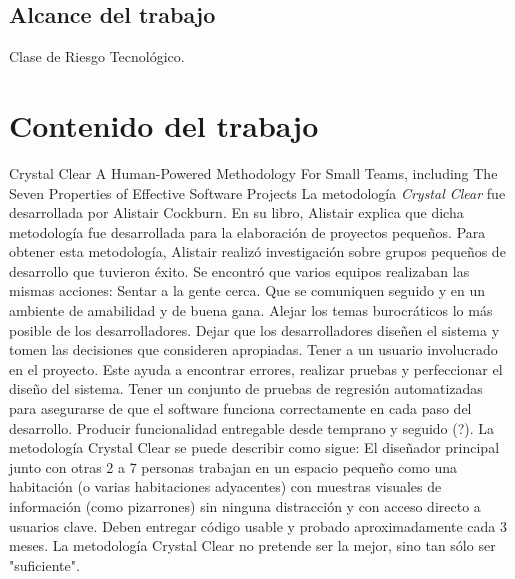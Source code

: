 \documentclass[12pt,a4paper]{article}
\begin{document}
\subsection{Alcance del trabajo}
Clase de Riesgo Tecnol\'ogico.
\pagebreak
\section{Contenido del trabajo}
Crystal Clear
A Human-Powered Methodology For Small Teams,
including
The Seven Properties of Effective Software Projects
\linebreak
La metodolog\'ia \textit{Crystal Clear} fue desarrollada por Alistair Cockburn.
En su libro, Alistair explica que dicha metodolog\'ia fue desarrollada para la elaboraci\'on de proyectos peque\~nos.
Para obtener esta metodolog\'ia, Alistair realiz\'o investigaci\'on sobre grupos peque\~nos de desarrollo que tuvieron \'exito. Se encontr\'o que varios equipos realizaban las mismas acciones:
Sentar a la gente cerca. Que se comuniquen seguido y en un ambiente de amabilidad y de buena gana.
Alejar los temas burocr\'aticos lo m\'as posible de los desarrolladores. Dejar que los desarrolladores dise\~nen el sistema y tomen las decisiones que consideren apropiadas.
Tener a un usuario involucrado en el proyecto. Este ayuda a encontrar errores, realizar pruebas y perfeccionar el dise\~no del sistema.
Tener un conjunto de pruebas de regresi\'on automatizadas para asegurarse de que el software funciona correctamente en cada paso del desarrollo.
Producir funcionalidad entregable desde temprano y seguido (?).
La metodolog\'ia Crystal Clear se puede describir como sigue:
El dise\~nador principal junto con otras 2 a 7 personas trabajan en un espacio peque\~no como una habitaci\'on (o varias habitaciones adyacentes) con muestras visuales de informaci\'on (como pizarrones) sin ninguna distracci\'on y con acceso directo a usuarios clave.
Deben entregar c\'odigo usable y probado aproximadamente cada 3 meses.
La metodolog\'ia Crystal Clear no pretende ser la mejor, sino tan s\'olo ser "suficiente".
\end{document}
